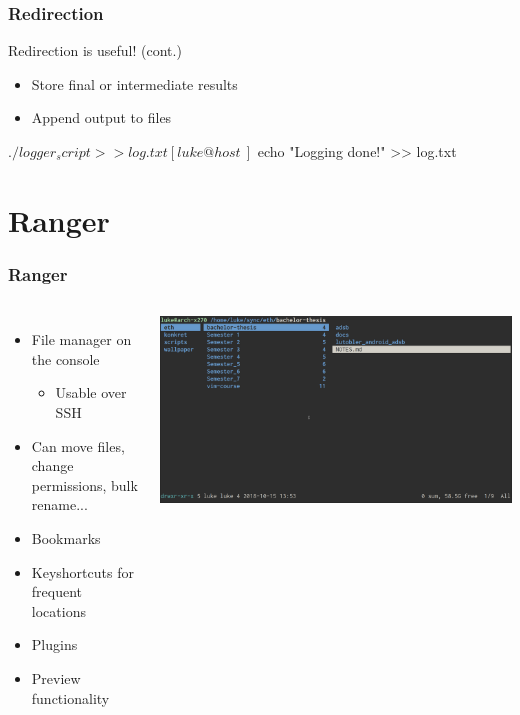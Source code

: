     \begin{frame}[t, fragile]
	    \frametitle{Redirection}
	    Redirection is useful! (cont.)
	    \begin{itemize}
		    \item Store final or intermediate results
		    \item Append output to files
	    \end{itemize}
	    \vspace{0.3cm}
	    \begin{bashenv}$ ./logger_script >> log.txt

[luke@host ~]$ echo "Logging done!" >> log.txt
	    \end{bashenv}
    \end{frame}

    \section{Ranger}

    \begin{frame}[t, fragile]
	    \frametitle{Ranger}
	    \begin{columns}[T]
		    \begin{itemize}
			    \item File manager on the console
				    \begin{itemize}
					    \item Usable over SSH
				    \end{itemize}
			    \item Can move files, change permissions, bulk rename...
			    \item Bookmarks
			    \item Keyshortcuts for frequent locations
			    \item Plugins
			    \item Preview functionality
		    \end{itemize}
		    \includegraphics[width=1.0\columnwidth]{img/ranger1.png}
	    \end{columns}
    \end{frame}

